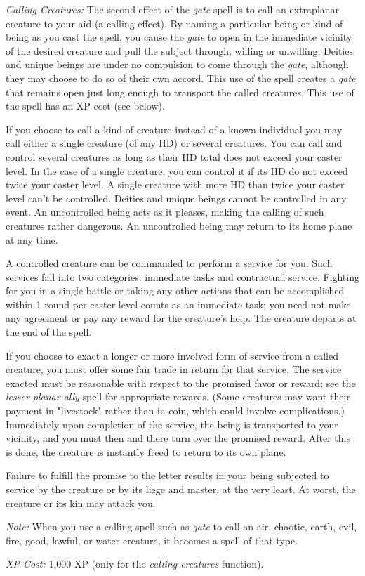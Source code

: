 \textit{Calling Creatures:} The second effect of the \textit{gate} spell is to 
call an extraplanar creature to your aid (a calling effect). By naming a particular 
being or kind of being as you cast the spell, you cause the \textit{gate} to open 
in the immediate vicinity of the desired creature and pull the subject through, 
willing or unwilling. Deities and unique beings are under no compulsion to come 
through the \textit{gate}, although they may choose to do so of their own accord. 
This use of the spell creates a \textit{gate} that remains open just long enough 
to transport the called creatures. This use of the spell has an XP cost (see below).

If you choose to call a kind of creature instead of a known individual you may 
call either a single creature (of any HD) or several creatures. You can call and 
control several creatures as long as their HD total does not exceed your caster 
level. In the case of a single creature, you can control it if its HD do not exceed 
twice your caster level. A single creature with more HD than twice your caster 
level can't be controlled. Deities and unique beings cannot be controlled in any 
event. An uncontrolled being acts as it pleases, making the calling of such creatures 
rather dangerous. An uncontrolled being may return to its home plane at any time.

A controlled creature can be commanded to perform a service for you. Such services 
fall into two categories: immediate tasks and contractual service. Fighting for 
you in a single battle or taking any other actions that can be accomplished within 
1 round per caster level counts as an immediate task; you need not make any agreement 
or pay any reward for the creature's help. The creature departs at the end of the 
spell.

If you choose to exact a longer or more involved form of service from a called 
creature, you must offer some fair trade in return for that service. The service 
exacted must be reasonable with respect to the promised favor or reward; see the 
\textit{lesser planar ally} spell for appropriate rewards. (Some creatures may 
want their payment in "livestock" rather than in coin, which could involve complications.) 
Immediately upon completion of the service, the being is transported to your vicinity, 
and you must then and there turn over the promised reward. After this is done, 
the creature is instantly freed to return to its own plane.

Failure to fulfill the promise to the letter results in your being subjected to 
service by the creature or by its liege and master, at the very least. At worst, 
the creature or its kin may attack you.

\textit{Note:} When you use a calling spell such as \textit{gate} to call an air, 
chaotic, earth, evil, fire, good, lawful, or water creature, it becomes a spell 
of that type.

\textit{XP Cost:} 1,000 XP (only for the \textit{calling creatures} function).

